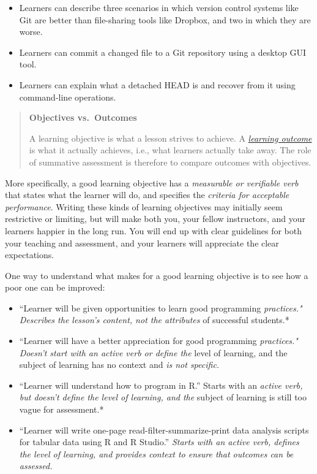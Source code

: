 \documentclass[10pt,statementpaper]{memoir}
\begin{document}
\begin{itemize}
\item
  Learners can describe three scenarios in which version control systems
  like Git are better than file-sharing tools like Dropbox, and two in
  which they are worse.
\item
  Learners can commit a changed file to a Git repository using a desktop
  GUI tool.
\item
  Learners can explain what a detached HEAD is and recover from it using
  command-line operations.
\end{itemize}

\begin{quote}
\textbf{Objectives vs.~Outcomes}

A learning objective is what a lesson strives to achieve. A
\emph{\href{gloss.html\#learning-outcome}{learning outcome}} is what it
actually achieves, i.e., what learners actually take away. The role of
summative assessment is therefore to compare outcomes with objectives.
\end{quote}

More specifically, a good learning objective has a \emph{measurable or
verifiable verb} that states what the learner will do, and specifies the
\emph{criteria for acceptable performance}. Writing these kinds of
learning objectives may initially seem restrictive or limiting, but will
make both you, your fellow instructors, and your learners happier in the
long run. You will end up with clear guidelines for both your teaching
and assessment, and your learners will appreciate the clear
expectations.

One way to understand what makes for a good learning objective is to see
how a poor one can be improved:

\begin{itemize}
\item
  ``Learner will be given opportunities to learn good programming
  \emph{practices." Describes the lesson's content, not the attributes
  }of successful students.*
\item
  ``Learner will have a better appreciation for good programming
  \emph{practices." Doesn't start with an active verb or define the
  }level of learning, and the subject of learning has no context and
  \emph{is not specific.}
\item
  ``Learner will understand how to program in R.'' Starts with an
  \emph{active verb, but doesn't define the level of learning, and the
  }subject of learning is still too vague for assessment.*
\item
  ``Learner will write one-page read-filter-summarize-print data
  analysis scripts for tabular data using R and R Studio.'' \emph{Starts
  with an active verb, defines the level of learning, and provides
  context to ensure that outcomes can be assessed.}
\end{itemize}
\end{document}
